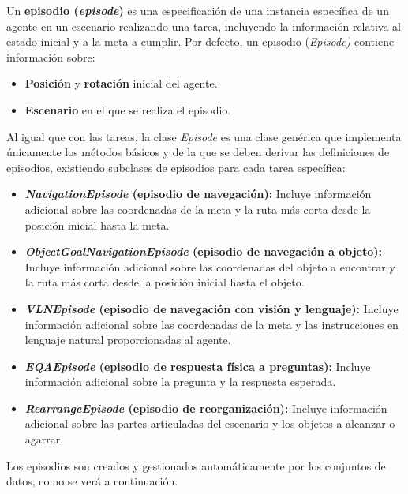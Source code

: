 Un \textbf{episodio (\textit{episode})} es una especificación de una instancia específica de un agente en un escenario realizando una tarea, incluyendo la información relativa al estado inicial y a la meta a cumplir. Por defecto, un episodio (\textit{Episode)} contiene información sobre:

\begin{itemize}
	\item \textbf{Posición} y \textbf{rotación} inicial del agente.
	\item \textbf{Escenario} en el que se realiza el episodio.
\end{itemize}

Al igual que con las tareas, la clase \textit{Episode} es una clase genérica que implementa únicamente los métodos básicos y de la que se deben derivar las definiciones de episodios, existiendo subclases de episodios para cada tarea específica:

\begin{itemize}
	\item \textbf{\textit{NavigationEpisode} (episodio de navegación):} Incluye información adicional sobre las coordenadas de la meta y la ruta más corta desde la posición inicial hasta la meta. 
	
	\item \textbf{\textit{ObjectGoalNavigationEpisode} (episodio de navegación a objeto):} Incluye información adicional sobre las coordenadas del objeto a encontrar y la ruta más corta desde la posición inicial hasta el objeto.
	
	\item \textbf{\textit{VLNEpisode} (episodio de navegación con visión y lenguaje):} Incluye información adicional sobre las coordenadas de la meta y las instrucciones en lenguaje natural proporcionadas al agente.

	\item \textbf{\textit{EQAEpisode} (episodio de respuesta física a preguntas):} Incluye información adicional sobre la pregunta y la respuesta esperada.
	
	\item \textbf{\textit{RearrangeEpisode} (episodio de reorganización):} Incluye información adicional sobre las partes articuladas del escenario y los objetos a alcanzar o agarrar. 	
	
\end{itemize}

Los episodios son creados y gestionados automáticamente por los conjuntos de datos, como se verá a continuación.

